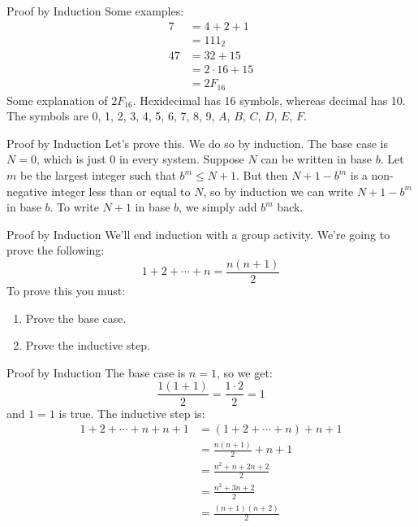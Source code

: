 \documentclass{beamer}
\begin{document}
    \begin{frame}{Proof by Induction}
        Some examples:
        \begin{align}
            7&=4+2+1\\
                &=111_{2}\\
            47&=32+15\\
                &=2\cdot{16}+15\\
                &=2F_{16}
        \end{align}
        Some explanation of $2F_{16}$. Hexidecimal has 16 symbols, whereas decimal has 10.
        The symbols are 0, 1, 2, 3, 4, 5, 6, 7, 8, 9, $A$, $B$, $C$, $D$, $E$, $F$.
    \end{frame}
    \begin{frame}{Proof by Induction}
        Let's prove this. We do so by induction. The base case
        is $N=0$, which is just 0 in every system. Suppose $N$ can be written in base $b$.
        Let $m$ be the largest integer such that $b^{m}\leq{N+1}$. But then
        $N+1-b^{m}$ is a non-negative integer less than or equal to $N$, so by induction we
        can write $N+1-b^{m}$ in base $b$. To write $N+1$ in base $b$, we simply add $b^{m}$ back.
    \end{frame}
    \begin{frame}{Proof by Induction}
        We'll end induction with a group activity. We're going to prove the following:
        \begin{equation}
            1+2+\cdots+n=\frac{n(n+1)}{2}
        \end{equation}
        To prove this you must:
        \begin{enumerate}
            \item Prove the base case.
            \item Prove the inductive step.
        \end{enumerate}
    \end{frame}
    \begin{frame}{Proof by Induction}
        The base case is $n=1$, so we get:
        \begin{equation}
            \frac{1(1+1)}{2}=\frac{1\cdot{2}}{2}=1
        \end{equation}
        and $1=1$ is true. The inductive step is:
        \begin{align}
            1+2+\cdots{+}n+n+1
                &=(1+2+\cdots{+}n)+n+1\\
                &=\frac{n(n+1)}{2}+n+1\\
                &=\frac{n^{2}+n+2n+2}{2}\\
                &=\frac{n^{2}+3n+2}{2}\\
                &=\frac{(n+1)(n+2)}{2}
        \end{align}
    \end{frame}
\end{document}
